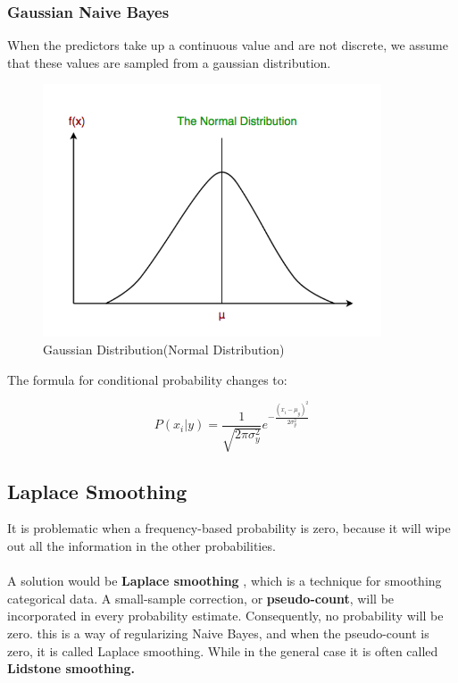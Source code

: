 \documentclass[12pt, A4]{report}
\begin{document}
	\subsubsection*{Gaussian Naive Bayes}
		When the predictors take up a continuous value and are not discrete, we assume that these values are sampled from a gaussian distribution.

		\begin{figure}[h]
			\centering
			\includegraphics[scale=0.4]{gaussiannaive.png}
			\caption{Gaussian Distribution(Normal Distribution)}
		\end{figure}

		The formula for conditional probability changes to:

		\begin{equation}
			P(x_i|y) = \frac{1}{\sqrt{2\pi\sigma_y^2}}e^{-\frac{(x_i-\mu_y)^2}{2\sigma_y^2}}
		\end{equation}

\subsection*{Laplace Smoothing}
	It is problematic when a frequency-based probability is zero, because it will wipe out all the information in the other probabilities.\\ \\
	A solution would be \textbf{Laplace smoothing} , which is a technique for smoothing categorical data. A small-sample correction, or \textbf{pseudo-count}, will be incorporated in every probability estimate. Consequently, no probability will be zero. this is a way of regularizing Naive Bayes, and when the pseudo-count is zero, it is called Laplace smoothing. While in the general case it is often called \textbf{Lidstone smoothing.}
\end{document}
